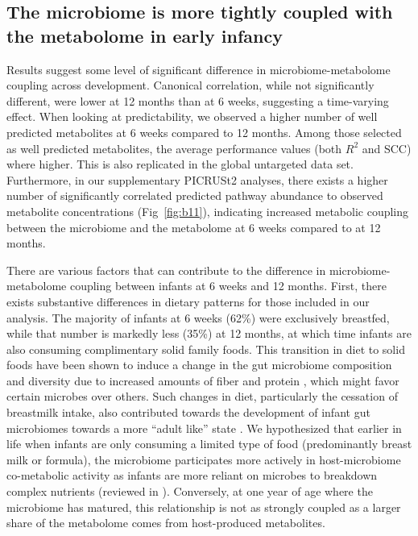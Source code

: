 \subsection{The microbiome is more tightly coupled with the metabolome in early infancy} 

Results suggest some level of significant difference in microbiome-metabolome coupling across development. Canonical correlation, while not significantly different, were lower at 12 months than at 6 weeks, suggesting a time-varying effect. When looking at predictability, we observed a higher number of well predicted metabolites at 6 weeks compared to 12 months. Among those selected as well predicted metabolites, the average performance values (both $R^2$ and SCC) where higher. This is also replicated in the global untargeted data set. Furthermore, in our supplementary PICRUSt2 analyses, there exists a higher number of significantly correlated predicted pathway abundance to observed metabolite concentrations (Fig~\ref{fig:b11}), indicating increased metabolic coupling between the microbiome and the metabolome at 6 weeks compared to at 12 months.  

There are various factors that can contribute to the difference in microbiome-metabolome coupling between infants at 6 weeks and 12 months. First, there exists substantive differences in dietary patterns for those included in our analysis. The majority of infants at 6 weeks (62\%) were exclusively breastfed, while that number is markedly less (35\%) at 12 months, at which time infants are also consuming complimentary solid family foods. This transition in diet to solid foods have been shown to induce a change in the gut microbiome composition and diversity due to increased amounts of fiber and protein \cite{moore2019temporal, laursen2017first}, which might favor certain microbes over others. Such changes in diet, particularly the cessation of breastmilk intake, also contributed towards the development of infant gut microbiomes towards a more “adult like” state \cite{backhed2015dynamics,moore2019temporal}. We hypothesized that earlier in life when infants are only consuming a limited type of food (predominantly breast milk or formula), the microbiome participates more actively in host-microbiome co-metabolic activity as infants are more reliant on microbes to breakdown complex nutrients (reviewed in \cite{milani2017first}). Conversely, at one year of age where the microbiome has matured, this relationship is not as strongly coupled as a larger share of the metabolome comes from host-produced metabolites.  

